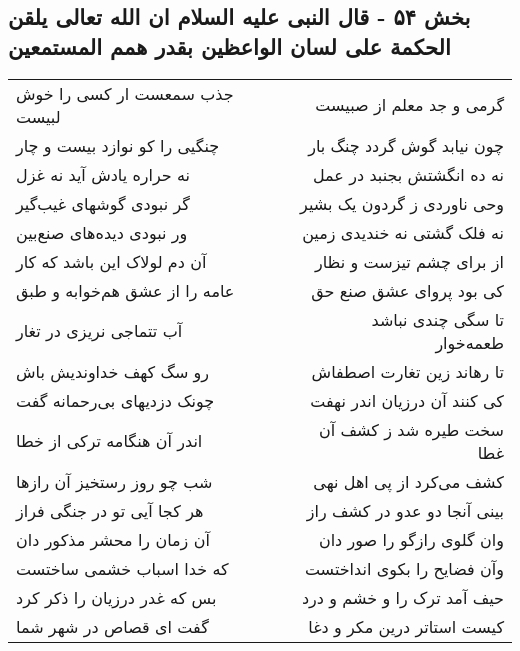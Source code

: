 \begin{center}
\section*{بخش ۵۴ - قال النبی علیه السلام ان الله تعالی یلقن الحکمة علی لسان الواعظین بقدر همم المستمعین}
\label{sec:sh054}
\begin{longtable}{l p{0.5cm} r}
جذب سمعست ار کسی را خوش لبیست
&&
گرمی و جد معلم از صبیست
\\
چنگیی را کو نوازد بیست و چار
&&
چون نیابد گوش گردد چنگ بار
\\
نه حراره یادش آید نه غزل
&&
نه ده انگشتش بجنبد در عمل
\\
گر نبودی گوشهای غیب‌گیر
&&
وحی ناوردی ز گردون یک بشیر
\\
ور نبودی دیده‌های صنع‌بین
&&
نه فلک گشتی نه خندیدی زمین
\\
آن دم لولاک این باشد که کار
&&
از برای چشم تیزست و نظار
\\
عامه را از عشق هم‌خوابه و طبق
&&
کی بود پروای عشق صنع حق
\\
آب تتماجی نریزی در تغار
&&
تا سگی چندی نباشد طعمه‌خوار
\\
رو سگ کهف خداوندیش باش
&&
تا رهاند زین تغارت اصطفاش
\\
چونک دزدیهای بی‌رحمانه گفت
&&
کی کنند آن درزیان اندر نهفت
\\
اندر آن هنگامه ترکی از خطا
&&
سخت طیره شد ز کشف آن غطا
\\
شب چو روز رستخیز آن رازها
&&
کشف می‌کرد از پی اهل نهی
\\
هر کجا آیی تو در جنگی فراز
&&
بینی آنجا دو عدو در کشف راز
\\
آن زمان را محشر مذکور دان
&&
وان گلوی رازگو را صور دان
\\
که خدا اسباب خشمی ساختست
&&
وآن فضایح را بکوی انداختست
\\
بس که غدر درزیان را ذکر کرد
&&
حیف آمد ترک را و خشم و درد
\\
گفت ای قصاص در شهر شما
&&
کیست استاتر درین مکر و دغا
\\
\end{longtable}
\end{center}
